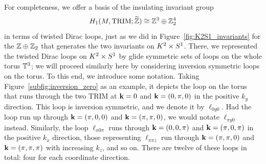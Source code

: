 For completeness, we offer a basis of the insulating invariant group
\begin{equation}\label{eq:inversion-insulating}
	H_1(M, \text{TRIM}; \widetilde{\mathbb{Z}}) \cong \mathbb{Z}^3\oplus\mathbb{Z}_2^4
\end{equation}
in terms of twisted Dirac loops, just as we did in Figure~\ref{fig:K2S1_invariants} for the $\mathbb{Z}\oplus\mathbb{Z}_2$ that generates the two invariants on $K^2\times S^1$. There, we represented the twisted Dirac loops on $K^2\times S^1$ by glide symmetric sets of loops on the whole torus $\mathbb{T}^3$; we will proceed similarly here by considering inversion symmetric loops on the torus. To this end, we introduce some notation. Taking Figure~\ref{subfig:inversion_zero} as an example, it depicts the loop on the torus that runs through the two TRIM at $\vb{k}=0$ and $\vb{k}=(0,\pi,0)$ in the positive $k_y$ direction. This loop is inversion symmetric, and we denote it by $\ell_{0y0}$. Had the loop run up through $\vb{k}=(\pi,0,0)$ and $\vb{k}=(\pi,\pi,0)$, we would notate $\ell_{\pi y0}$ instead. Similarly, the loop $\ell_{x0\pi}$ runs through $\vb{k}=(0,0,\pi)$ and $\vb{k}=(\pi,0,\pi)$ in the positive $k_x$ direction, those representing $\ell_{\pi\pi z}$ run through $\vb{k}=(\pi,\pi,0)$ and $\vb{k}=(\pi,\pi,\pi)$ with increasing $k_z$, and so on. There are twelve of these loops in total: four for each coordinate direction.

